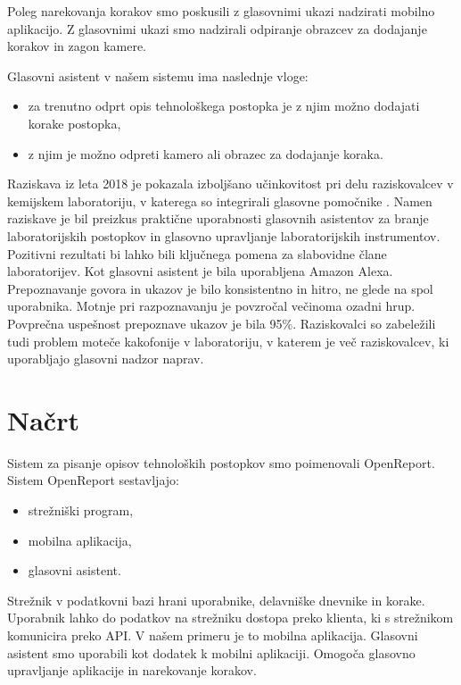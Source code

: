 \documentclass[a4paper, 12pt]{book}
\begin{document}
Poleg narekovanja korakov smo poskusili z glasovnimi ukazi nadzirati mobilno aplikacijo.
Z glasovnimi ukazi smo nadzirali odpiranje obrazcev za dodajanje korakov in zagon kamere.

\bigbreak 
Glasovni asistent v našem sistemu ima naslednje vloge:
\begin{itemize}
	\item za trenutno odprt opis tehnološkega postopka je z njim možno dodajati korake postopka,
	\item z njim je možno odpreti kamero ali obrazec za dodajanje koraka.
\end{itemize}

Raziskava iz leta 2018 je pokazala izboljšano učinkovitost pri delu raziskovalcev v kemijskem laboratoriju, v katerega so integrirali glasovne pomočnike \cite{austerjost2018introducing}.
Namen raziskave je bil preizkus praktične uporabnosti glasovnih asistentov za branje laboratorijskih postopkov in glasovno upravljanje laboratorijskih instrumentov.
Pozitivni rezultati bi lahko bili ključnega pomena za slabovidne člane laboratorijev.
Kot glasovni asistent je bila uporabljena Amazon Alexa.
Prepoznavanje govora in ukazov je bilo konsistentno in hitro, ne glede na spol uporabnika.
Motnje pri razpoznavanju je povzročal večinoma ozadni hrup.
Povprečna uspešnost prepoznave ukazov je bila 95\%.
Raziskovalci so zabeležili tudi problem moteče kakofonije v laboratoriju, v katerem je več raziskovalcev, ki uporabljajo glasovni nadzor naprav.

\section{Načrt}

Sistem za pisanje opisov tehnoloških postopkov smo poimenovali OpenReport. 
Sistem OpenReport sestavljajo:

\begin{itemize}
	\item strežniški program, 
	\item mobilna aplikacija,
	\item glasovni asistent.
\end{itemize}

Strežnik v podatkovni bazi hrani uporabnike, delavniške dnevnike in korake.
Uporabnik lahko do podatkov na strežniku dostopa preko klienta, ki s strežnikom komunicira preko API.
V našem primeru je to mobilna aplikacija.
Glasovni asistent smo uporabili kot dodatek k mobilni aplikaciji.
Omogoča glasovno upravljanje aplikacije in narekovanje korakov.
\end{document}
